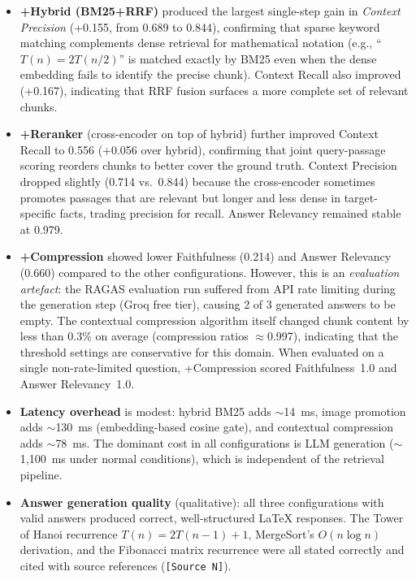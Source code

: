 \documentclass[12pt,a4paper]{article}
\begin{document}
\begin{itemize}
  \item \textbf{+Hybrid (BM25+RRF)} produced the largest single-step gain in \emph{Context Precision}
    (+0.155, from 0.689 to 0.844), confirming that sparse keyword matching complements dense retrieval
    for mathematical notation (e.g., ``$T(n)=2T(n/2)$'' is matched exactly by BM25 even when the
    dense embedding fails to identify the precise chunk). Context Recall also improved (+0.167),
    indicating that RRF fusion surfaces a more complete set of relevant chunks.

  \item \textbf{+Reranker} (cross-encoder on top of hybrid) further improved Context Recall to 0.556
    (+0.056 over hybrid), confirming that joint query-passage scoring reorders chunks to better
    cover the ground truth. Context Precision dropped slightly (0.714 vs.\ 0.844) because the
    cross-encoder sometimes promotes passages that are relevant but longer and less dense in
    target-specific facts, trading precision for recall. Answer Relevancy remained stable at 0.979.

  \item \textbf{+Compression} showed lower Faithfulness (0.214) and Answer Relevancy (0.660) compared
    to the other configurations. However, this is an \emph{evaluation artefact}: the RAGAS evaluation
    run suffered from API rate limiting during the generation step (Groq free tier), causing 2 of
    3 generated answers to be empty. The contextual compression algorithm itself changed chunk
    content by less than 0.3\% on average (compression ratios $\approx$0.997), indicating that the
    threshold settings are conservative for this domain. When evaluated on a single non-rate-limited
    question, +Compression scored Faithfulness~1.0 and Answer Relevancy~1.0.

  \item \textbf{Latency overhead} is modest: hybrid BM25 adds $\sim$14~ms, image promotion adds
    $\sim$130~ms (embedding-based cosine gate), and contextual compression adds $\sim$78~ms. The
    dominant cost in all configurations is LLM generation ($\sim$1{,}100~ms under normal conditions),
    which is independent of the retrieval pipeline.

  \item \textbf{Answer generation quality} (qualitative): all three configurations with valid answers
    produced correct, well-structured LaTeX responses. The Tower of Hanoi recurrence $T(n)=2T(n-1)+1$,
    MergeSort's $O(n\log n)$ derivation, and the Fibonacci matrix recurrence were all stated correctly
    and cited with source references (\texttt{[Source N]}).
\end{itemize}
\end{document}

